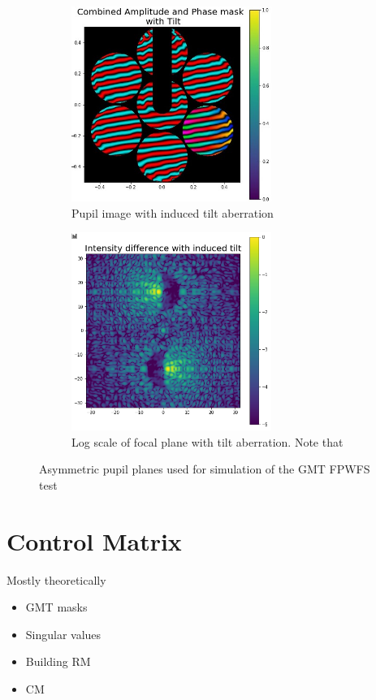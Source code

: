 \begin{figure}[H]
\centering
\begin{subfigure}{.5\textwidth}
  \centering
  \includegraphics[width=6.5cm]{Figures/tilt_comb.jpg}
  \caption{Pupil image with induced tilt aberration}
  \label{fig:tilt_pupil}
\end{subfigure}%
\begin{subfigure}{.5\textwidth}
  \centering
  \includegraphics[width=6.5cm]{Figures/PSF_tilt.png}
  \caption{Log scale of focal plane with tilt aberration.  Note that }
  \label{fig:tilt_focal}
\end{subfigure}
\caption{Asymmetric pupil planes used for simulation of the GMT FPWFS test}
\label{fig:abb_images}
\end{figure}



\section{Control Matrix}



Mostly theoretically

\begin{itemize}
    \item GMT masks
    \item Singular values
    \item Building RM
    \item CM
\end{itemize}